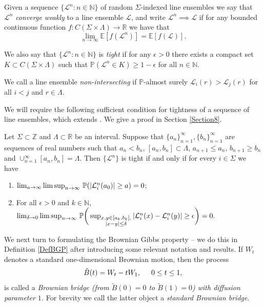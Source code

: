 \begin{definition}
Given a sequence $\{ \mathcal{L}^n: n \in \mathbb{N} \}$ of random $\Sigma$-indexed line ensembles we say that $\mathcal{L}^n$ {\em converge weakly} to a line ensemble $\mathcal{L}$, and write $\mathcal{L}^n \implies \mathcal{L}$ if for any bounded continuous function $f: C (\Sigma \times \Lambda) \rightarrow \mathbb{R}$ we have that 
$$\lim_{n \rightarrow \infty} \mathbb{E} \left[ f(\mathcal{L}^n) \right] = \mathbb{E} \left[ f(\mathcal{L}) \right].$$

We also say that $\{ \mathcal{L}^n: n \in \mathbb{N} \}$ is {\em tight} if for any $\epsilon > 0$ there exists a compact set $K \subset C (\Sigma \times \Lambda)$ such that $\mathbb{P}(\mathcal{L}^n \in K) \geq 1- \epsilon$ for all $n \in \mathbb{N}$.

We call a line ensemble {\em non-intersecting} if $\mathbb{P}$-almost surely $\mathcal{L}_i(r) > \mathcal{L}_j(r)$  for all $i < j$ and $r \in \Lambda$.
\end{definition}

We will require the following sufficient condition for tightness of a sequence of line ensembles, which extends \cite[Theorem 7.3]{Billing}. We give a proof in Section \ref{Section8}.

\begin{lemma}\label{2Tight}
	Let $\Sigma \subset \mathbb{Z}$ and $\Lambda\subset\mathbb{R}$ be an interval. Suppose that $\{a_n\}_{n = 1}^\infty, \{b_n\}_{n = 1}^\infty$ are sequences of real numbers such that $a_n < b_n$, $[a_n, b_n] \subset \Lambda$, $a_{n+1} \leq a_n$, $b_{n+1} \geq b_n$ and $\cup_{n = 1}^\infty [a_n, b_n] = \Lambda$. Then $\{\mathcal{L}^n\}$ is tight if and only if for every $i\in\Sigma$ we have
	\begin{enumerate}[label=(\roman*)]
		\item $\lim_{a\to\infty} \limsup_{n\to\infty}\, \mathbb{P}(|\mathcal{L}^n_i(a_0)|\geq a) = 0$;
		\item For all $\epsilon>0$ and $k \in \mathbb{N}$,  $\lim_{\delta\to 0} \limsup_{n\to\infty}\, \mathbb{P}\bigg(\sup_{\substack{x,y\in [a_k,b_k], \\ |x-y|\leq\delta}} |\mathcal{L}^n_i(x) - \mathcal{L}^n_i(y)| \geq \epsilon\bigg) = 0.$
		
	\end{enumerate}
\end{lemma}

We next turn to formulating the Brownian Gibbs property -- we do this in Definition \ref{DefBGP} after introducing some relevant notation and results. If $W_t$ denotes a standard one-dimensional Brownian motion, then the process
$$\tilde{B}(t) =  W_t - t W_1, \hspace{5mm} 0 \leq t \leq 1,$$
is called a {\em Brownian bridge (from $\tilde{B}(0) = 0$ to $\tilde{B}(1) = 0 $) with diffusion parameter $1$.} For brevity we call the latter object a {\em standard Brownian bridge}.

